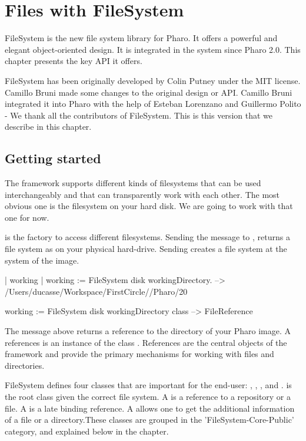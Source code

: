 \documentclass[a4paper,10pt,twoside]{book}
\begin{document}
\fi
\sloppy
\chapter{Files with FileSystem }
 
FileSystem is the new file system library for Pharo. It offers a powerful and elegant object-oriented design. 
It is integrated in the system since Pharo 2.0. This chapter presents the key API it offers. 

FileSystem has been originally developed by Colin Putney under the MIT license. Camillo Bruni made some changes to the original design or API. Camillo Bruni integrated it into Pharo with the help of Esteban Lorenzano and Guillermo Polito - We thank all the contributors of FileSystem. This is this version that we describe in this chapter. 

\section{Getting started}
The framework supports different kinds of filesystems that can be used interchangeably and that can transparently work with each other. The most obvious one is the filesystem on your hard disk. We are going to work with that one for now. 

 is the factory to access different filesystems. 
Sending the message  to , returns a file system as on your physical hard-drive. Sending  creates a file system at the system of the image. 

\begin{code}{}
| working |
working := FileSystem disk workingDirectory.
--> /Users/ducasse/Workspace/FirstCircle//Pharo/20

working := FileSystem disk workingDirectory class 
--> FileReference
\end{code} 

The message  above returns a reference to the directory of your Pharo image. A references is an instance of the class . References are the central objects of the framework and provide the primary mechanisms for working with files and directories. 

FileSystem defines four classes that are important for the end-user: , , , and .  is the root class given the correct file system. A  is a reference to a repository or a file. A  is a late binding reference. A  allows one to get the additional information of a file or a directory.These classes are grouped in the 'FileSystem-Core-Public' category, and explained below in the chapter.
\end{document}
